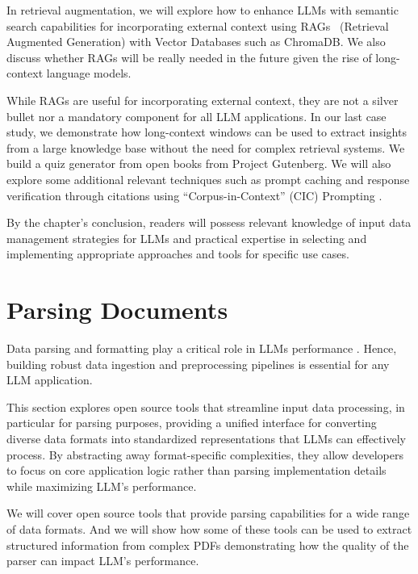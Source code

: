 In retrieval augmentation, we will explore how to enhance LLMs with semantic search capabilities for incorporating external context using RAGs~ (Retrieval Augmented Generation) with Vector Databases such as ChromaDB. We also discuss whether RAGs will be really needed in the future given the rise of long-context language models.

While RAGs are useful for incorporating external context, they are not a silver bullet nor a mandatory component for all LLM applications. In our last case study, we demonstrate how long-context windows can be used to extract insights from a large knowledge base without the need for complex retrieval systems. We build a quiz generator from open books from Project Gutenberg. We will also explore some additional relevant techniques such as prompt caching and response verification through citations using ``Corpus-in-Context'' (CIC) Prompting .

By the chapter's conclusion, readers will possess relevant knowledge of input data management strategies for LLMs and practical expertise in selecting and implementing appropriate approaches and tools for specific use cases.
\section{Parsing Documents}
\label{parsing}

Data parsing and formatting play a critical role in LLMs performance . Hence, building robust data ingestion and preprocessing pipelines is essential for any LLM application.

This section explores open source tools that streamline input data processing, in particular for parsing purposes, providing a unified interface for converting diverse data formats into standardized representations that LLMs can effectively process. By abstracting away format-specific complexities, they allow developers to focus on core application logic rather than parsing implementation details while maximizing LLM's performance.

We will cover open source tools that provide parsing capabilities for a wide range of data formats. And we will show how some of these tools can be used to extract structured information from complex PDFs demonstrating how the quality of the parser can impact LLM's performance.

